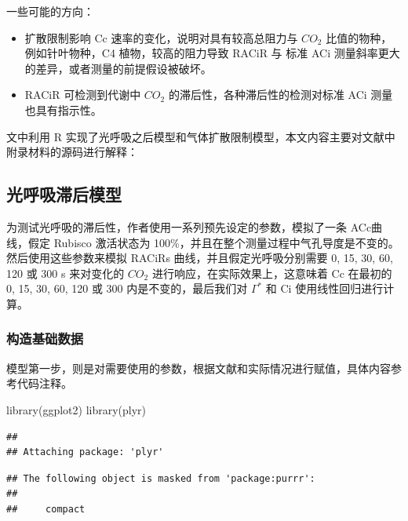 \documentclass[
]{krantz}
\makeatletter
\newenvironment{Shaded}{\begin{snugshade}}{\end{snugshade}}
\newcommand{\FunctionTok}[1]{\textcolor[rgb]{0.00,0.00,0.00}{#1}}
\newcommand{\NormalTok}[1]{#1}
\newenvironment{kframe}{%
\medskip{}
\setlength{\fboxsep}{.8em}
 \def\at@end@of@kframe{}%
 \ifinner\ifhmode%
  \def\at@end@of@kframe{\end{minipage}}%
  \begin{minipage}{\columnwidth}%
 \fi\fi%
 \def\FrameCommand##1{\hskip\@totalleftmargin \hskip-\fboxsep
 \colorbox{shadecolor}{##1}\hskip-\fboxsep
     \hskip-\linewidth \hskip-\@totalleftmargin \hskip\columnwidth}%
 \MakeFramed {\advance\hsize-\width
   \@totalleftmargin\z@ \linewidth\hsize
   \@setminipage}}%
 {\par\unskip\endMakeFramed%
 \at@end@of@kframe}
\renewenvironment{Shaded}{\begin{kframe}}{\end{kframe}}
\makeatother
\begin{document}
一些可能的方向：

\begin{itemize}
\item
  扩散限制影响 Cc 速率的变化，说明对具有较高总阻力与 \(CO_2\) 比值的物种，例如针叶物种，C4 植物，较高的阻力导致 RACiR 与 标准 ACi 测量斜率更大的差异，或者测量的前提假设被破坏。
\item
  RACiR 可检测到代谢中 \(CO_2\) 的滞后性，各种滞后性的检测对标准 ACi 测量也具有指示性。
\end{itemize}

文中利用 R 实现了光呼吸之后模型和气体扩散限制模型，本文内容主要对文献中附录材料的源码进行解释：

\hypertarget{multi2}{%
\subsection{光呼吸滞后模型}\label{multi2}}

为测试光呼吸的滞后性，作者使用一系列预先设定的参数，模拟了一条 ACc曲线，假定 Rubisco 激活状态为 100\%，并且在整个测量过程中气孔导度是不变的。然后使用这些参数来模拟 RACiRs 曲线，并且假定光呼吸分别需要 0, 15, 30, 60, 120 或 300 s 来对变化的 \(CO_2\) 进行响应，在实际效果上，这意味着 Cc 在最初的 0, 15, 30, 60, 120 或 300 内是不变的，最后我们对 \(\Gamma^*\) 和 Ci 使用线性回归进行计算。

\hypertarget{multi3}{%
\subsubsection{构造基础数据}\label{multi3}}

模型第一步，则是对需要使用的参数，根据文献和实际情况进行赋值，具体内容参考代码注释。

\begin{Shaded}
\begin{Highlighting}[]
\FunctionTok{library}\NormalTok{(ggplot2)}
\FunctionTok{library}\NormalTok{(plyr)}
\end{Highlighting}
\end{Shaded}

\begin{verbatim}
## 
## Attaching package: 'plyr'
\end{verbatim}

\begin{verbatim}
## The following object is masked from 'package:purrr':
## 
##     compact
\end{verbatim}
\end{document}
